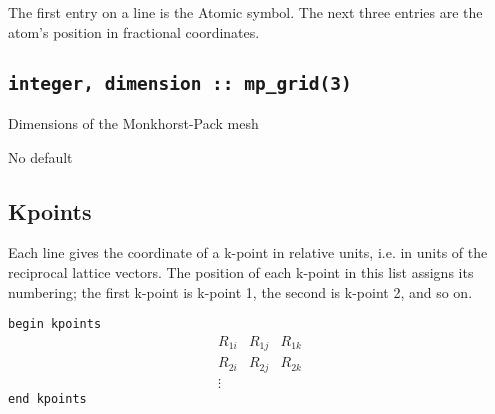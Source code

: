 The first entry on a line is the Atomic symbol. The next three entries
are the atom's position in fractional coordinates.


\subsection[mp\_grid]{\tt integer, dimension :: mp\_grid(3)}
Dimensions of the Monkhorst-Pack mesh

No default


%
%
%
%
%

%

\subsection[Kpoints]{Kpoints}
Each line gives the coordinate of a k-point
in relative units, i.e. in units of the reciprocal lattice
vectors.
The position  of each k-point in this
list assigns its numbering; the first k-point is k-point 1, the second
is k-point 2, and so on.


\noindent \verb#begin kpoints# \\
$$
\begin{array}{ccc}
 R_{1i} & R_{1j} & R_{1k} \\
 R_{2i} & R_{2j} & R_{2k} \\
\vdots
\end{array}
$$
\verb#end kpoints#

